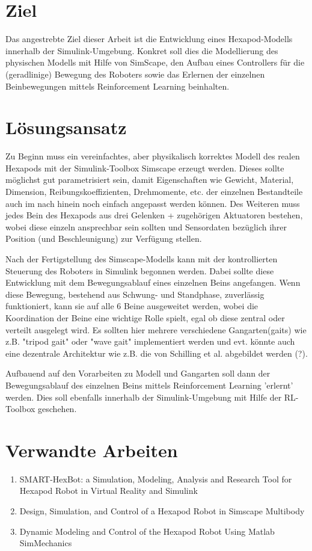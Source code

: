 \section{Ziel}
Das angestrebte Ziel dieser Arbeit ist die Entwicklung eines Hexapod-Modells innerhalb der Simulink-Umgebung.
Konkret soll dies die Modellierung des physischen Modells mit Hilfe von SimScape, den Aufbau eines Controllers für die (geradlinige) Bewegung des Roboters sowie das Erlernen der einzelnen Beinbewegungen mittels Reinforcement Learning beinhalten.

\section{Lösungsansatz}
Zu Beginn muss ein vereinfachtes, aber physikalisch korrektes Modell des realen Hexapods mit der Simulink-Toolbox Simscape erzeugt werden.
Dieses sollte möglichst gut parametrisiert sein, damit Eigenschaften wie Gewicht, Material, Dimension, Reibungskoeffizienten, Drehmomente, etc. der einzelnen Bestandteile auch im nach hinein noch einfach angepasst werden können.
Des Weiteren muss jedes Bein des Hexapods aus drei Gelenken + zugehörigen Aktuatoren bestehen, wobei diese einzeln ansprechbar sein sollten und Sensordaten bezüglich ihrer Position (und Beschleunigung) zur Verfügung stellen.

Nach der Fertigstellung des Simscape-Modells kann mit der kontrollierten Steuerung des Roboters in Simulink begonnen werden.
Dabei sollte diese Entwicklung mit dem Bewegungsablauf eines einzelnen Beins angefangen.
Wenn diese Bewegung, bestehend aus Schwung- und Standphase, zuverlässig funktioniert, kann sie auf alle 6 Beine ausgeweitet werden, wobei die Koordination der Beine eine wichtige Rolle spielt, egal ob diese zentral oder verteilt ausgelegt wird.
Es sollten hier mehrere verschiedene Gangarten(gaits) wie z.B. "tripod gait" oder "wave gait" implementiert werden und evt. könnte auch eine dezentrale Architektur wie z.B. die von Schilling et al. abgebildet werden (?).

Aufbauend auf den Vorarbeiten zu Modell und Gangarten soll dann der Bewegungsablauf des einzelnen Beins mittels Reinforcement Learning 'erlernt' werden. Dies soll ebenfalls innerhalb der Simulink-Umgebung mit Hilfe der RL-Toolbox geschehen.





\section{Verwandte Arbeiten}
\begin{enumerate}
\item SMART-HexBot: a Simulation, Modeling, Analysis and
Research Tool for Hexapod Robot in Virtual Reality and
Simulink

\item Design, Simulation, and Control of a Hexapod Robot in
Simscape Multibody

\item Dynamic Modeling and Control of the Hexapod Robot Using Matlab SimMechanics

\end{enumerate}


